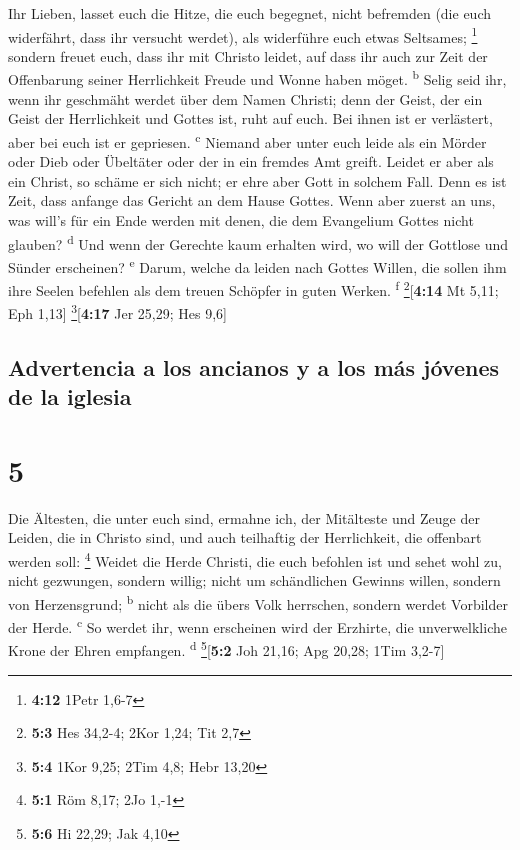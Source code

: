  Ihr Lieben, lasset euch die Hitze, die euch begegnet,
nicht befremden (die euch widerfährt, dass ihr versucht werdet), als
widerführe euch etwas Seltsames; \footnote{\textbf{4:12} 1Petr 1,6-7}
 sondern freuet euch, dass ihr mit Christo leidet, auf
dass ihr auch zur Zeit der Offenbarung seiner Herrlichkeit Freude und
Wonne haben möget. \textsuperscript{b}  Selig seid ihr,
wenn ihr geschmäht werdet über dem Namen Christi; denn der Geist, der
ein Geist der Herrlichkeit und Gottes ist, ruht auf euch. Bei ihnen ist
er verlästert, aber bei euch ist er gepriesen. \textsuperscript{c}
 Niemand aber unter euch leide als ein Mörder oder Dieb
oder Übeltäter oder der in ein fremdes Amt greift. 
Leidet er aber als ein Christ, so schäme er sich nicht; er ehre aber
Gott in solchem Fall.  Denn es ist Zeit, dass anfange das
Gericht an dem Hause Gottes. Wenn aber zuerst an uns, was will's für ein
Ende werden mit denen, die dem Evangelium Gottes nicht glauben?
\textsuperscript{d}  Und wenn der Gerechte kaum erhalten
wird, wo will der Gottlose und Sünder erscheinen? \textsuperscript{e}
 Darum, welche da leiden nach Gottes Willen, die sollen
ihm ihre Seelen befehlen als dem treuen Schöpfer in guten Werken.
\textsuperscript{f} \footnote{\textbf{5:3} Hes 34,2-4; 2Kor 1,24; Tit
  2,7}{[}\textbf{4:14} Mt 5,11; Eph 1,13{]} \footnote{\textbf{5:4} 1Kor
  9,25; 2Tim 4,8; Hebr 13,20}{[}\textbf{4:17} Jer 25,29; Hes 9,6{]}

\hypertarget{advertencia-a-los-ancianos-y-a-los-muxe1s-juxf3venes-de-la-iglesia}{%
\subsection{Advertencia a los ancianos y a los más jóvenes de la
iglesia}\label{advertencia-a-los-ancianos-y-a-los-muxe1s-juxf3venes-de-la-iglesia}}

\hypertarget{section-4}{%
\section{5}\label{section-4}}

 Die Ältesten, die unter euch sind, ermahne ich, der
Mitälteste und Zeuge der Leiden, die in Christo sind, und auch
teilhaftig der Herrlichkeit, die offenbart werden soll: \footnote{\textbf{5:1}
  Röm 8,17; 2Jo 1,-1}  Weidet die Herde Christi, die euch
befohlen ist und sehet wohl zu, nicht gezwungen, sondern willig; nicht
um schändlichen Gewinns willen, sondern von Herzensgrund;
\textsuperscript{b}  nicht als die übers Volk herrschen,
sondern werdet Vorbilder der Herde. \textsuperscript{c} 
So werdet ihr, wenn erscheinen wird der Erzhirte, die unverwelkliche
Krone der Ehren empfangen. \textsuperscript{d}
\footnote{\textbf{5:6} Hi 22,29; Jak 4,10}{[}\textbf{5:2} Joh 21,16; Apg
20,28; 1Tim 3,2-7{]}

